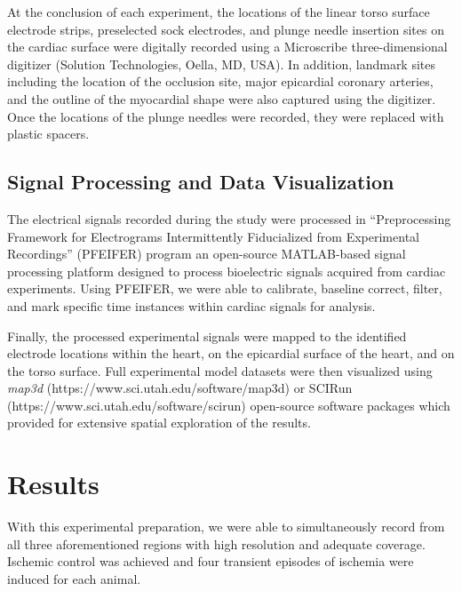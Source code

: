 \documentclass[twocolumn]{cinc}
\newcommand{\mapthreed}{\textit{map3d }}
\begin{document}

At the conclusion of each experiment, the locations of the linear torso
surface electrode strips, preselected sock electrodes, and
plunge needle insertion sites on the cardiac surface were digitally
recorded using a Microscribe three-dimensional digitizer (Solution
Technologies, Oella, MD, USA). In addition, landmark sites including the
location of the occlusion site, major epicardial
coronary arteries, and the outline of the myocardial shape were also
captured using the digitizer. Once the locations of the plunge needles were
recorded, they were replaced with plastic spacers.


\subsection{Signal Processing and Data Visualization}

The electrical signals recorded during the study were processed in
``Preprocessing Framework for Electrograms Intermittently Fiducialized from
Experimental Recordings'' (PFEIFER) program an open-source MATLAB-based
signal processing platform designed to process bioelectric signals acquired
from cardiac experiments. \cite{Rodenhauser2018} Using
PFEIFER, we were able to calibrate, baseline correct, filter, and mark
specific time instances within cardiac signals for analysis.

Finally, the processed experimental signals were mapped to the
identified electrode locations within the heart, on the epicardial surface
of the heart, and on the torso surface. Full experimental model datasets
were then visualized using \mapthreed
(https://www.sci.utah.edu/software/map3d) or SCIRun
(https://www.sci.utah.edu/software/scirun) open-source software
packages which provided for
extensive spatial exploration of the results.

\section{Results}

With this experimental preparation, we were
able to simultaneously record from all three aforementioned regions with
high resolution and adequate coverage. Ischemic control was achieved and four transient episodes of
ischemia were induced for each animal.
\end{document}
